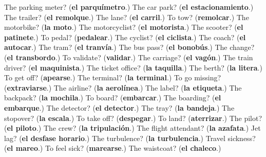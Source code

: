 \begin{tcolorbox}[breakable,colback=teal!4,colframe=teal!35!black,title={Before you move on}]
The parking meter? (\textbf{el parquímetro}.) The car park? (\textbf{el estacionamiento}.) The trailer? (\textbf{el remolque}.) The lane? (\textbf{el carril}.) To tow? (\textbf{remolcar}.) The motorbike? (\textbf{la moto}.) The motorcyclist? (\textbf{el motorista}.) The scooter? (\textbf{el patinete}.) To pedal? (\textbf{pedalear}.) The cyclist? (\textbf{el ciclista}.) The coach? (\textbf{el autocar}.) The tram? (\textbf{el tranvía}.) The bus pass? (\textbf{el bonobús}.) The change? (\textbf{el transbordo}.) To validate? (\textbf{validar}.) The carriage? (\textbf{el vagón}.) The train driver? (\textbf{el maquinista}.) The ticket office? (\textbf{la taquilla}.) The berth? (\textbf{la litera}.) To get off? (\textbf{apearse}.) The terminal? (\textbf{la terminal}.) To go missing? (\textbf{extraviarse}.) The airline? (\textbf{la aerolínea}.) The label? (\textbf{la etiqueta}.) The backpack? (\textbf{la mochila}.) To board? (\textbf{embarcar}.) The boarding? (\textbf{el embarque}.) The detector? (\textbf{el detector}.) The tray? (\textbf{la bandeja}.) The stopover? (\textbf{la escala}.) To take off? (\textbf{despegar}.) To land? (\textbf{aterrizar}.) The pilot? (\textbf{el piloto}.) The crew? (\textbf{la tripulación}.) The flight attendant? (\textbf{la azafata}.) Jet lag? (\textbf{el desfase horario}.) The turbulence? (\textbf{la turbulencia}.) Travel sickness? (\textbf{el mareo}.) To feel sick? (\textbf{marearse}.) The waistcoat? (\textbf{el chaleco}.)
\end{tcolorbox}
